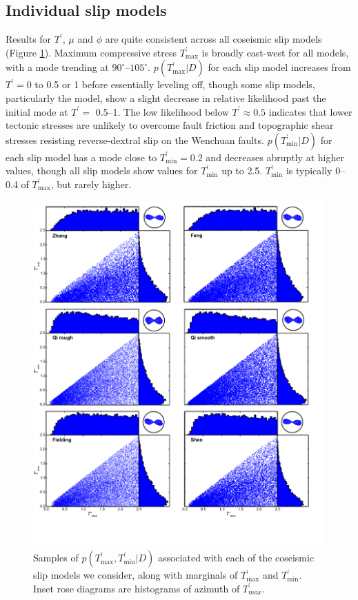 \documentclass[twocolumn,jgrga]{AGUTeX}
\begin{document}
\begin{article}
\subsection{Individual slip models}\label{individual-slip-models}

Results for $T^\prime$, $\mu$ and $\phi$ are quite consistent across all
coseismic slip models (Figure \ref{fig:T_scatters}). Maximum compressive
stress $T^\prime_{\mathrm{max}}$ is broadly east-west for all models,
with a mode trending at $90^{\circ}$--$105^{\circ}$.
$p(T^\prime_{\mathrm{max}}|D)$ for each slip model increases from
$T^\prime = 0$ to 0.5 or 1 before essentially leveling off, though some
slip models, particularly the \citet{qi2011} model, show a
slight decrease in relative likelihood past the initial mode at
$T^\prime =$ 0.5--1.
The low likelihood below $T^\prime \approx 0.5$ indicates that lower
tectonic stresses are unlikely to overcome fault friction and
topographic shear stresses resisting reverse-dextral slip on the
Wenchuan faults. $p(T^\prime_{\mathrm{min}} | D)$ for each slip model
has a mode close to $T^\prime_{\mathrm{min}} = 0.2 $ and decreases
abruptly at higher values, though all slip models show values for
$T^\prime_{\mathrm{min}}$ up to 2.5. $T^\prime_{\mathrm{min}}$ is
typically 0--0.4 of $T^\prime_{\mathrm{max}}$, but rarely higher.

\begin{figure}%
\centering
\includegraphics[width=40pc]{../figures/T_scatters.pdf}
\caption{Samples of
$p(T^\prime_{\mathrm{max}},T^\prime_{\mathrm{min}} | D)$ associated with
each of the coseismic slip models we consider, along with marginals of
$T^\prime_{\mathrm{max}}$ and $T^\prime_{\mathrm{min}}$. Inset rose
diagrams are histograms of azimuth of
$T^\prime_{max}$.}
\label{fig:T_scatters}
\end{figure}


\end{article}
\end{document}
